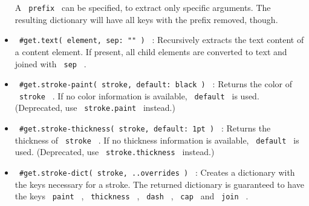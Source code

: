 \begin{itemize}
  A \texttt{\ prefix\ } can be specified, to extract only specific
  arguments. The resulting dictionary will have all keys with the prefix
  removed, though.

\begin{Shaded}
\begin{Highlighting}[]
\OperatorTok{{-}}\NormalTok{( }\OperatorTok{,}\OperatorTok{=} \NormalTok{(}
        \OperatorTok{,} \OperatorTok{,} \OperatorTok{,}
\OperatorTok{:}\OperatorTok{\%}
\NormalTok{    )}
\NormalTok{)[}
\NormalTok{    \#}\NormalTok{(}\OperatorTok{,}\OperatorTok{:}\NormalTok{)(}
\OperatorTok{:}\OperatorTok{,}\OperatorTok{:}
\NormalTok{    )}\OperatorTok{,}
\NormalTok{]}

\OperatorTok{{-}}\NormalTok{(}
\OperatorTok{:} \OperatorTok{\%,}
\OperatorTok{{-}}\OperatorTok{:}\OperatorTok{,}\OperatorTok{{-}}\OperatorTok{:} 
\NormalTok{)[\#}\NormalTok{(}\NormalTok{)]}
\end{Highlighting}
\end{Shaded}
\item
  \texttt{\ \#get.text(\ element,\ sep:\ ""\ )\ } : Recursively extracts
  the text content of a content element. If present, all child elements
  are converted to text and joined with \texttt{\ sep\ } .
\item
  \texttt{\ \#get.stroke-paint(\ stroke,\ default:\ black\ )\ } :
  Returns the color of \texttt{\ stroke\ } . If no color information is
  available, \texttt{\ default\ } is used. (Deprecated, use
  \texttt{\ stroke.paint\ } instead.)
\item
  \texttt{\ \#get.stroke-thickness(\ stroke,\ default:\ 1pt\ )\ } :
  Returns the thickness of \texttt{\ stroke\ } . If no thickness
  information is available, \texttt{\ default\ } is used. (Deprecated,
  use \texttt{\ stroke.thickness\ } instead.)
\item
  \texttt{\ \#get.stroke-dict(\ stroke,\ ..overrides\ )\ } : Creates a
  dictionary with the keys necessary for a stroke. The returned
  dictionary is guaranteed to have the keys \texttt{\ paint\ } ,
  \texttt{\ thickness\ } , \texttt{\ dash\ } , \texttt{\ cap\ } and
  \texttt{\ join\ } .


\end{itemize}
